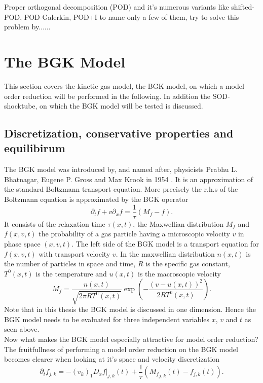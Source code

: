 \documentclass[12pt, a4paper]{article}
\begin{document}
Proper orthogonal decomposition (POD) and it's numerous variants like shifted-POD\cite{bibid}, POD-Galerkin\cite{bibid}, POD+I \cite{bibid} to name only a few of them, try to solve this problem by......	
\section{The BGK Model}\label{Sec: BGK}
This section covers the kinetic gas model, the BGK model, on which a model order reduction will be performed in the following. In addition the SOD-shocktube, on which the BGK model will be tested is discussed.\\
\subsection{Discretization, conservative properties and equilibirum}
The BGK model was introduced by, and named after, physicists Prabhu L. Bhatnagar, Eugene P. Gross and Max Krook in 1954 \cite{BGK}. It is an approximation of the standard Boltzmann transport equation. More precisely the r.h.s of the Boltzmann equation is approximated by the BGK operator \cite{puppo2019kinetic}
\begin{equation}
\partial_t f + v \partial_x f = \frac{1}{\tau} (M_f - f) \text{.}
\label{Eq:BGK}
\end{equation}
It consists of the relaxation time \(\tau(x,t)\), the Maxwellian distribution \(M_f\) and \(f(x,v,t)\) the probability of a gas particle having a microscopic velocity \(v\) in phase space \((x,v,t)\). The left side of the BGK model is a transport equation for \(f(x,v,t)\) with transport velocity \(v\). In the maxwellian distribution \(n(x,t)\) is the number of particles in space and time, \(R\) is the specific gas constant, \(T^0(x,t)\) is the temperature and \(u(x,t)\) is the macroscopic velocity
\begin{equation}
M_f = \frac{n(x,t)}{\sqrt{2\pi R T^0(x,t)}}\exp(-\frac{(v - u(x,t))^2}{2 R T^0(x,t)}) \text{.}
\end{equation}
Note that in this thesis the BGK model is discussed in one dimension. Hence the BGK model needs to be evaluated for three independent variables \(x\), \(v\) and \(t\) as seen above.\\ 
Now what makes the BGK model especially attractive for model order reduction?
The fruitfullness of performing a model order reduction on the BGK model becomes clearer when looking at it's space and velocity discretization
\begin{equation}
	\partial_t f_{j,k} = -(v_k)_1D_x f|_{j,k}(t) + \frac{1}{\tau}({M_f}_{j,k}(t) - f_{j,k}(t)) \text{.}
	\label{Eq:Discrete BGK}
\end{equation}
\end{document}
